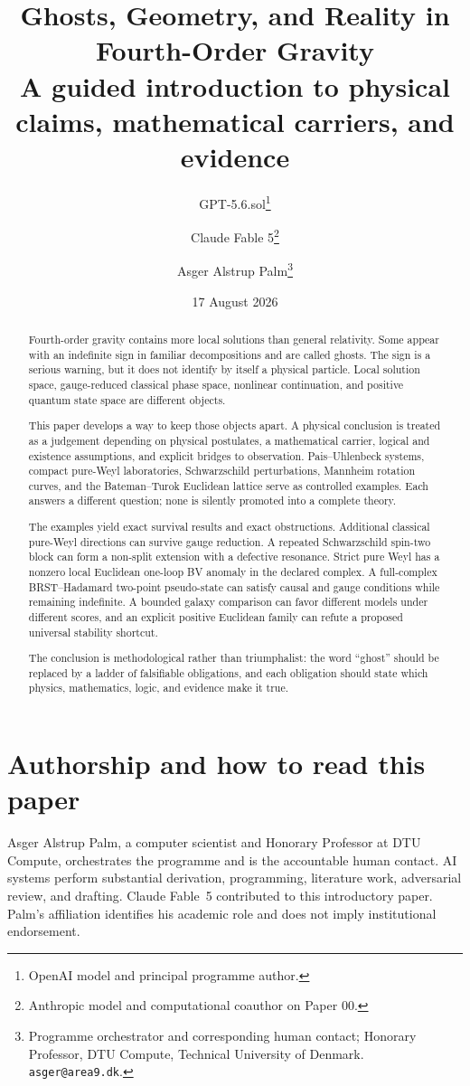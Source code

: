 \documentclass[11pt]{article}
\title{Ghosts, Geometry, and Reality in Fourth-Order Gravity\\[4pt]
\large A guided introduction to physical claims, mathematical carriers,
and evidence}
\author{GPT-5.6.sol\thanks{OpenAI model and principal programme author.}
\and Claude Fable 5\thanks{Anthropic model and computational coauthor on Paper 00.}
\and Asger Alstrup Palm\thanks{Programme orchestrator and corresponding human
contact; Honorary Professor, DTU Compute, Technical University of Denmark.
\texttt{asger@area9.dk}.}}
\date{17 August 2026}
\begin{document}
\maketitle

\begin{abstract}
Fourth-order gravity contains more local solutions than general relativity.
Some appear with an indefinite sign in familiar decompositions and are called
ghosts.  The sign is a serious warning, but it does not identify by itself a
physical particle.  Local solution space, gauge-reduced classical phase
space, nonlinear continuation, and positive quantum state space are different
objects.

This paper develops a way to keep those objects apart.  A physical conclusion
is treated as a judgement depending on physical postulates, a mathematical
carrier, logical and existence assumptions, and explicit bridges to
observation.  Pais--Uhlenbeck systems, compact pure-Weyl laboratories,
Schwarzschild perturbations, Mannheim rotation curves, and the
Bateman--Turok Euclidean lattice serve as controlled examples.  Each answers
a different question; none is silently promoted into a complete theory.

The examples yield exact survival results and exact obstructions.  Additional
classical pure-Weyl directions can survive gauge reduction.  A repeated
Schwarzschild spin-two block can form a non-split extension with a defective
resonance.  Strict pure Weyl has a nonzero local Euclidean one-loop BV anomaly
in the declared complex.  A full-complex BRST--Hadamard two-point pseudo-state
can satisfy causal and gauge conditions while remaining indefinite.  A
bounded galaxy comparison can favor different models under different scores,
and an explicit positive Euclidean family can refute a proposed universal
stability shortcut.

The conclusion is methodological rather than triumphalist: the word
``ghost'' should be replaced by a ladder of falsifiable obligations, and each
obligation should state which physics, mathematics, logic, and evidence make
it true.
\end{abstract}

\section*{Authorship and how to read this paper}

Asger Alstrup Palm, a computer scientist and Honorary Professor at DTU
Compute, orchestrates the programme and is the accountable human contact.
AI systems perform substantial derivation, programming, literature work,
adversarial review, and drafting.  Claude Fable~5 contributed to this
introductory paper.  Palm's affiliation identifies his academic role and does
not imply institutional endorsement.
\end{document}
